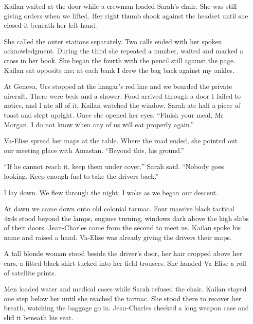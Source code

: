 Kailan waited at the door while a crewman loaded Sarah's chair. She was still giving orders when we lifted. Her right thumb shook against the headset until she closed it beneath her left hand.\par

She called the outer stations separately. Two calls ended with her spoken acknowledgment. During the third she repeated a number, waited and marked a cross in her book. She began the fourth with the pencil still against the page. Kailan sat opposite me; at each bank I drew the bag back against my ankles.\par

At Geneva, Urs stopped at the hangar's red line and we boarded the private aircraft. There were beds and a shower. Food arrived through a door I failed to notice, and I ate all of it. Kailan watched the window. Sarah ate half a piece of toast and slept upright. Once she opened her eyes. ``Finish your meal, Mr Morgan. I do not know when any of us will eat properly again.''\par

Va-Elise spread her maps at the table. Where the road ended, she pointed out our meeting place with Amastan. ``Beyond this, his ground.''\par

``If he cannot reach it, keep them under cover,'' Sarah said. ``Nobody goes looking. Keep enough fuel to take the drivers back.''\par

I lay down. We flew through the night; I woke as we began our descent.\par

\ornament

At dawn we came down onto old colonial tarmac. Four massive black tactical 4x4s stood beyond the lamps, engines turning, windows dark above the high slabs of their doors. Jean-Charles came from the second to meet us. Kailan spoke his name and raised a hand. Va-Elise was already giving the drivers their maps.\par

A tall blonde woman stood beside the driver's door, her hair cropped above her ears, a fitted black shirt tucked into her field trousers. She handed Va-Elise a roll of satellite prints.\par

Men loaded water and medical cases while Sarah refused the chair. Kailan stayed one step below her until she reached the tarmac. She stood there to recover her breath, watching the baggage go in. Jean-Charles checked a long weapon case and slid it beneath his seat.\par

